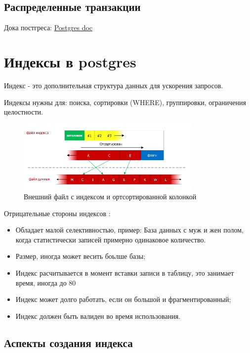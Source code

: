 \subsection{Распределенные транзакции}

Дока постгреса:
\href{https://www.postgresql.org/docs/12/sql-prepare-transaction.html}{Postgres doc}

\section{Индексы в postgres}
Индекс - это дополнительная структура данных для ускорения запросов.

Индексы нужны для: поиска, сортировки (WHERE), группировки, ограничения целостности.

\begin{figure}[h!]
\centering
\includegraphics[width=0.8\textwidth]{img/index-sort.png}
\caption{Внешний файл с индексом и ортсортированной колонкой}
\label{index-sort}
\end{figure}

Отрицательные стороны индексов \label{index-usage}:
\begin{itemize}
\item Обладает малой селективностью, пример:
База данных с муж и жен полом, когда статистически записей примерно одинаковое количество.
\item Размер, иногда может весить боьлше базы;
\item Индекс расчитывается в момент вставки записи в таблицу, это занимает время, иногда до 80%
\item Индекс может долго работать, если он большой и фрагментированный;
\item Индекс должен быть валиден во время использования.
\end{itemize}

\subsection{Аспекты создания индекса}

